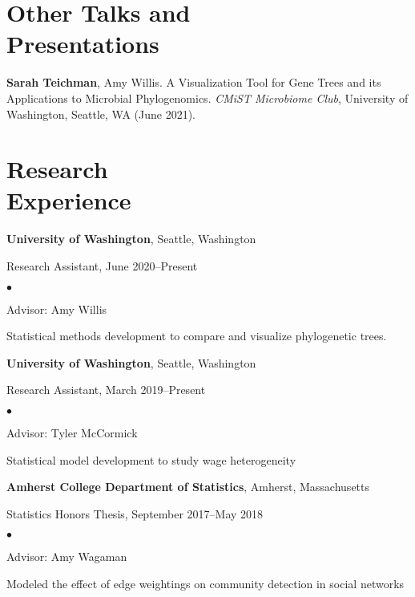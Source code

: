 \documentclass[margin,centered]{res}
\newenvironment{list1}{
  \begin{list}{\ding{113}}{%
      \setlength{\itemsep}{0in}
      \setlength{\parsep}{0in} \setlength{\parskip}{0in}
      \setlength{\topsep}{0in} \setlength{\partopsep}{0in}
      \setlength{\leftmargin}{0.17in}}}{\end{list}}
\newenvironment{list2}{
  \begin{list}{$\bullet$}{%
      \setlength{\itemsep}{0in}
      \setlength{\parsep}{0in} \setlength{\parskip}{0in}
      \setlength{\topsep}{0in} \setlength{\partopsep}{0in}
      \setlength{\leftmargin}{0.2in}}}{\end{list}}
\begin{document}
\begin{resume}
\section{\sc Other Talks and \\ Presentations}

\textbf{Sarah Teichman}, Amy Willis. A Visualization Tool for Gene Trees and its Applications to Microbial Phylogenomics. \emph{CMiST Microbiome Club}, University of Washington, Seattle, WA (June 2021).

\section{\sc Research\\ Experience}
{\bf University of Washington},  Seattle, Washington
\begin{list1}
\item[] 
Research Assistant, June 2020--Present
\begin{list2}
\vspace*{.05in}
\item Advisor: Amy Willis
\item Statistical methods development to compare and visualize phylogenetic trees. 
\end{list2} 
\end{list1}


{\bf University of Washington},  Seattle, Washington
\begin{list1}
\item[] 
Research Assistant, March 2019--Present
\begin{list2}
\vspace*{.05in}
\item Advisor: Tyler McCormick
\item Statistical model development to study wage heterogeneity
\end{list2} 
\end{list1}


{\bf Amherst College Department of Statistics}, Amherst, Massachusetts
\begin{list1}
\item[] 
Statistics Honors Thesis, September 2017--May 2018
\begin{list2}
\vspace*{.05in}
\item
Advisor: Amy Wagaman
\item Modeled the effect of edge weightings on community detection in social networks
\end{list2} 
\end{list1}



\end{resume}
\end{document}
